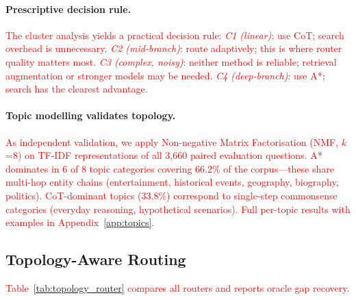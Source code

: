 \documentclass[11pt]{article}
\begin{document}
\paragraph{Prescriptive decision rule.}
\textcolor{red}{The cluster analysis yields a practical decision rule: \emph{C1 (linear)}: use CoT; search overhead is unnecessary. \emph{C2 (mid-branch)}: route adaptively; this is where router quality matters most. \emph{C3 (complex, noisy)}: neither method is reliable; retrieval augmentation or stronger models may be needed. \emph{C4 (deep-branch)}: use A*; search has the clearest advantage.}

\paragraph{Topic modelling validates topology.}
\textcolor{red}{As independent validation, we apply Non-negative Matrix Factorisation (NMF, $k$=8) on TF-IDF representations of all 3,660 paired evaluation questions. A* dominates in 6 of 8 topic categories covering 66.2\% of the corpus---these share multi-hop entity chains (entertainment, historical events, geography, biography, politics). CoT-dominant topics (33.8\%) correspond to single-step commonsense categories (everyday reasoning, hypothetical scenarios). Full per-topic results with examples in Appendix~\ref{app:topics}.}

\subsection{Topology-Aware Routing}
\label{sec:topology_routing}

\textcolor{red}{Table~\ref{tab:topology_router} compares all routers and reports oracle gap recovery.}
\end{document}
